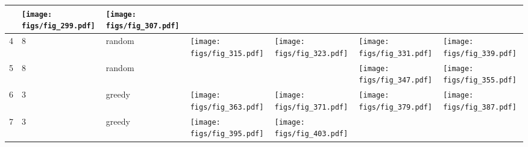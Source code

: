 \documentclass[oneside,canadian,landscape]{article}
\begin{document}
\begin{center}
\begin{longtable}{|l|l|l||l|l|l|l|}
\begin{minipage}{3.5cm}
\end{minipage}
&\begin{minipage}{3.5cm}
\texttt{[image: figs/fig\_299.pdf]}
\end{minipage}
&\begin{minipage}{3.5cm}
\texttt{[image: figs/fig\_307.pdf]}
\end{minipage}
\\ \hline
4&8&random&\begin{minipage}{3.5cm}
\texttt{[image: figs/fig\_315.pdf]}
\end{minipage}
&\begin{minipage}{3.5cm}
\texttt{[image: figs/fig\_323.pdf]}
\end{minipage}
&\begin{minipage}{3.5cm}
\texttt{[image: figs/fig\_331.pdf]}
\end{minipage}
&\begin{minipage}{3.5cm}
\texttt{[image: figs/fig\_339.pdf]}
\end{minipage}
\\ \hline
5&8&random&&&\begin{minipage}{3.5cm}
\texttt{[image: figs/fig\_347.pdf]}
\end{minipage}
&\begin{minipage}{3.5cm}
\texttt{[image: figs/fig\_355.pdf]}
\end{minipage}
\\ \hline
6&3&greedy&\begin{minipage}{3.5cm}
\texttt{[image: figs/fig\_363.pdf]}
\end{minipage}
&\begin{minipage}{3.5cm}
\texttt{[image: figs/fig\_371.pdf]}
\end{minipage}
&\begin{minipage}{3.5cm}
\texttt{[image: figs/fig\_379.pdf]}
\end{minipage}
&\begin{minipage}{3.5cm}
\texttt{[image: figs/fig\_387.pdf]}
\end{minipage}
\\ \hline
7&3&greedy&\begin{minipage}{3.5cm}
\texttt{[image: figs/fig\_395.pdf]}
\end{minipage}
&\begin{minipage}{3.5cm}
\texttt{[image: figs/fig\_403.pdf]}
\end{minipage}

\end{longtable}
\end{center}
\end{document}
